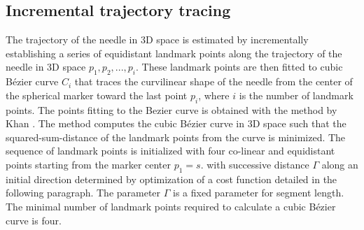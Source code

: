 \subsection*{\textbf{Incremental trajectory tracing}} \label{inctracing}

The trajectory of the needle in 3D space is estimated by incrementally establishing a series of equidistant landmark points along the trajectory of the needle in 3D space $p_1, p_2, ..., p_i$. These landmark points are then fitted to cubic B\'ezier curve $C_i$  that traces the curvilinear shape of the needle from the center of the spherical marker toward the last point $p_i$, where $i$ is the number of landmark points. The points fitting to the Bezier curve is obtained with the method by Khan \cite{khan2007approximation}. The method computes the cubic B\'ezier curve in 3D space such that the squared-sum-distance of the landmark points from the curve is minimized. The sequence of landmark points is initialized with four co-linear and equidistant points starting from the marker center $p_1=s$. with successive distance $\Gamma$ along an initial direction determined by optimization of a cost function detailed in the following paragraph. The  parameter  $\Gamma$ is a fixed parameter for segment length. The minimal number of landmark points required to calculate a cubic B\'ezier curve is four. 


